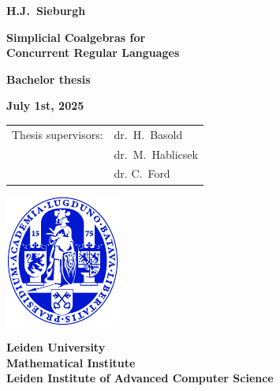 \pagestyle{empty}

\vspace*{1em}

\begin{center}

{\Large\bf 
H.J.\ Sieburgh
} 

\vspace{1em} 

{\LARGE\bf 
Simplicial Coalgebras for
\\ \vspace{.25em} 
Concurrent Regular Languages
} 

\vspace{10em} 

{\large\bf 
Bachelor thesis
} 

\vspace{1em}

{\large\bf 
July 1st, 2025
}

\vspace{8em} 

{\large\bf
\begin{tabular}{ll}
Thesis supervisors: & dr.\ H.\ Basold\\
                            & dr.\ M.\ Hablicsek\\
                            & dr. C.\ Ford\\
\end{tabular}
}

\vfill

\includegraphics[width = 0.2\linewidth]{ulzegel_blauw.pdf}\\

\vspace{2em}

{\large\bf 
Leiden University\\
Mathematical Institute\\
Leiden Institute of Advanced Computer Science\\
}

\end{center} \newpage